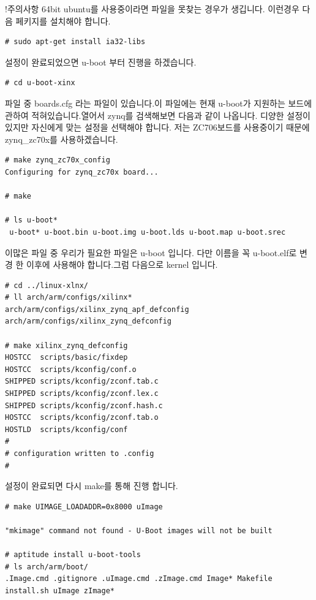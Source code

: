 \documentclass[11pt
  , a4paper
  , article
  , oneside
]{memoir}
\begin{document}
!주의사항
64bit ubuntu를 사용중이라면 파일을 못찾는 경우가 생깁니다. 
이런경우 다음 페키지를 설치해야 합니다.
\begin{lstlisting}[style=termstyle]
# sudo apt-get install ia32-libs
\end{lstlisting}

설정이 완료되었으면 u-boot 부터 진행을 하겠습니다.
\begin{lstlisting}[style=termstyle]
# cd u-boot-xinx
\end{lstlisting}

파일 중 boards.cfg 라는 파일이 있습니다.이 파일에는 현재 u-boot가 지원하는 보드에 관하여 적혀있습니다.열어서 zynq를 검색해보면 다음과 같이 나옵니다. 디양한 설정이 있지만 자신에게 맞는 설정을 선택해야 합니다. 저는 ZC706보드를 사용중이기 때문에 zynq\_zc70x를 사용하겠습니다.

\begin{lstlisting}[style=termstyle]
# make zynq_zc70x_config
Configuring for zynq_zc70x board...

# make

# ls u-boot*
 u-boot* u-boot.bin u-boot.img u-boot.lds u-boot.map u-boot.srec
\end{lstlisting}

이많은 파일 중 우리가 필요한 파일은 u-boot 입니다. 다만 이름을 꼭 u-boot.elf로 변경 한 이후에 사용해야 합니다.그럼 다음으로 kernel 입니다.

\begin{lstlisting}[style=termstyle]
# cd ../linux-xlnx/
# ll arch/arm/configs/xilinx*
arch/arm/configs/xilinx_zynq_apf_defconfig
arch/arm/configs/xilinx_zynq_defconfig

# make xilinx_zynq_defconfig
HOSTCC  scripts/basic/fixdep
HOSTCC  scripts/kconfig/conf.o
SHIPPED scripts/kconfig/zconf.tab.c
SHIPPED scripts/kconfig/zconf.lex.c
SHIPPED scripts/kconfig/zconf.hash.c
HOSTCC  scripts/kconfig/zconf.tab.o
HOSTLD  scripts/kconfig/conf
#
# configuration written to .config
#
\end{lstlisting}

설정이 완료되면 다시 make를 통해 진행 합니다.

\begin{lstlisting}[style=termstyle]
# make UIMAGE_LOADADDR=0x8000 uImage

"mkimage" command not found - U-Boot images will not be built

# aptitude install u-boot-tools
# ls arch/arm/boot/
.Image.cmd .gitignore .uImage.cmd .zImage.cmd Image* Makefile install.sh uImage zImage*
\end{lstlisting}
\end{document}
